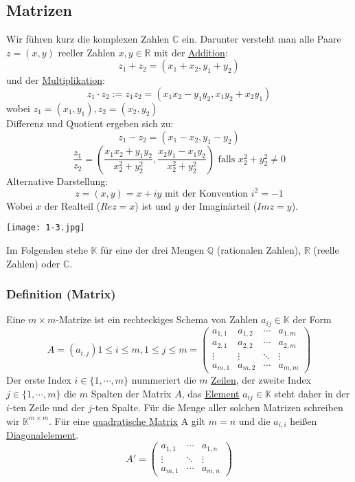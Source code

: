 \subsection{Matrizen}
Wir führen kurz die komplexen Zahlen $\mathbb{C}$ ein.  Darunter versteht man alle Paare $z=(x,y)$ reeller Zahlen $x,y\in \mathbb{R}$ mit der \underline{Addition}: \[z_1+z_2=(x_1+x_2,y_1+y_2)\] und der \underline{Multiplikation}: \[z_1\cdot z_2:=z_1z_2=(x_1x_2-y_1y_2,x_1y_2+x_2y_1)\] wobei $z_1=(x_1,y_1),z_2=(x_2,y_2)$ \\
Differenz und Quotient ergeben sich zu:
\[ z_1-z_2=(x_1-x_2,y_1-y_2)\]
\[\dfrac{z_1}{z_2} = \left(\dfrac{x_1x_2+y_1y_2}{x_2^2+y_2^2},\dfrac{x_2y_1-x_1y_2}{x_2^2+y_2^2}\right) \text{ falls } x_2^2+y_2^2\not = 0\]
Alternative Darstellung:
\[z=(x,y) = x+iy \text{ mit der Konvention } i^2=-1\]
Wobei $x$ der Realteil ($Rez=x$) ist und $y$ der Imaginärteil ($Imz=y$).\\
\begin{center}
\texttt{[image: 1-3.jpg]}
\end{center}
Im Folgenden stehe $\mathbb{K}$ für eine der drei Mengen $\mathbb{Q}$ (rationalen Zahlen), $\mathbb{R}$ (reelle Zahlen) oder $\mathbb{C}$.
\subsubsection{Definition (Matrix)}
Eine $m\times m$-Matrize ist ein rechteckiges Schema von Zahlen $a_{ij}\in \mathbb{K}$ der Form \[A=(a_{i,j}) 1\leq i\leq m,1\leq j\leq m =\left( \begin{array}{cccc}a_{1,1}& a_{1,2}& \cdots & a_{1,m}\\ a_{2,1}& a_{2,2}& \cdots & a_{2,m} \\ \vdots & \vdots & \ddots & \vdots \\ a_{m,1}& a_{m,2}& \cdots & a_{m,m}\end{array}\right) \]
Der erste Index $i\in\{1,\cdots ,m\}$ nummeriert die $m$ \underline{Zeilen}, der zweite Index $j\in \{1,\cdots ,m\}$ die $m$ Spalten der Matrix $A$, das \underline{Element} $a_{ij}\in \mathbb{K}$ steht daher in der $i$-ten Zeile und der $j$-ten Spalte.  F\"{u}r die Menge aller solchen Matrizen schreiben wir $\mathbb{K}^{m\times m}$. Für eine \underline{quadratische Matrix} A gilt $m = n$ und die $a_{i,i}$ heißen \underline{Diagonalelement}.
\[A'=\left( \begin{array}{ccc}a_{1,1}& \cdots & a_{1,n}\\\vdots & \ddots & \vdots\\a_{m,1}& \cdots & a_{m,n}\end{array}\right)\]

